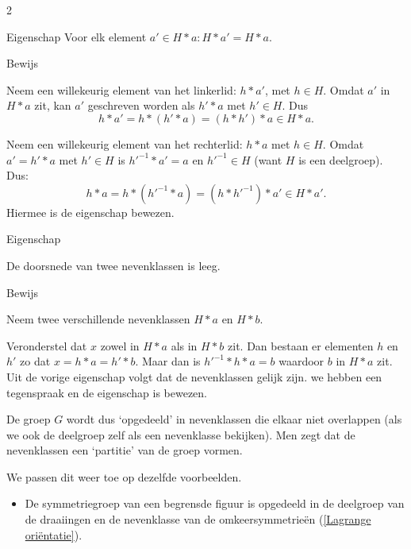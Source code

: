 \begin{multicols}{2}
\begin{kader}{Eigenschap}{}
    Voor elk element $a'\in H*a: H*a'=H*a.$
    
    \end{kader}
    
    \begin{kader}{Bewijs}{}
    
    Neem een willekeurig element van het linkerlid: $h*a'$, met $h\in H$. Omdat $a'$ in $H*a$ zit, kan $a'$ geschreven worden als $h'*a$ met $h'\in H$. Dus
    $$h*a'=h*(h'*a)=(h*h')*a\in H*a.$$
    
    Neem een willekeurig element van het rechterlid: $h*a$ met $h\in H$. Omdat $a'=h'*a$ met $h'\in H$ is $h'^{-1}*a'=a$ en $h'^{-1}\in H$ (want $H$ is een deelgroep). Dus:
    $$h*a=h*(h'^{-1}*a)=(h*h'^{-1})*a'\in H*a'.$$
    Hiermee is de eigenschap bewezen.

\end{kader}
\vspace{1cm}
\begin{kader}{Eigenschap}{}

    De doorsnede van twee nevenklassen is leeg.

\end{kader}

\begin{kader}{Bewijs}{}

    Neem twee verschillende nevenklassen $H*a$ en $H*b$.  
    
    Veronderstel dat $x$ zowel in $H*a$ als in $H*b$ zit. Dan bestaan er elementen $h$ en $h'$ zo dat $x=h*a=h'*b$. Maar dan is $h'^{-1}*h*a=b$ waardoor $b$ in $H*a$ zit. Uit de vorige eigenschap volgt dat de nevenklassen gelijk zijn. we hebben een tegenspraak en de eigenschap is bewezen.

\end{kader}

De groep $G$ wordt dus `opgedeeld' in nevenklassen die elkaar niet overlappen (als we ook de deelgroep zelf als een nevenklasse bekijken). Men zegt dat de nevenklassen een `partitie' van de groep vormen. 

We passen dit weer toe op dezelfde voorbeelden.
\begin{itemize}

\item De symmetriegroep van een begrensde figuur is opgedeeld in de deelgroep van de draaiingen en de nevenklasse van de omkeersymmetrieën (\autoref{Lagrange oriëntatie}). 





\end{itemize}
\end{multicols}

